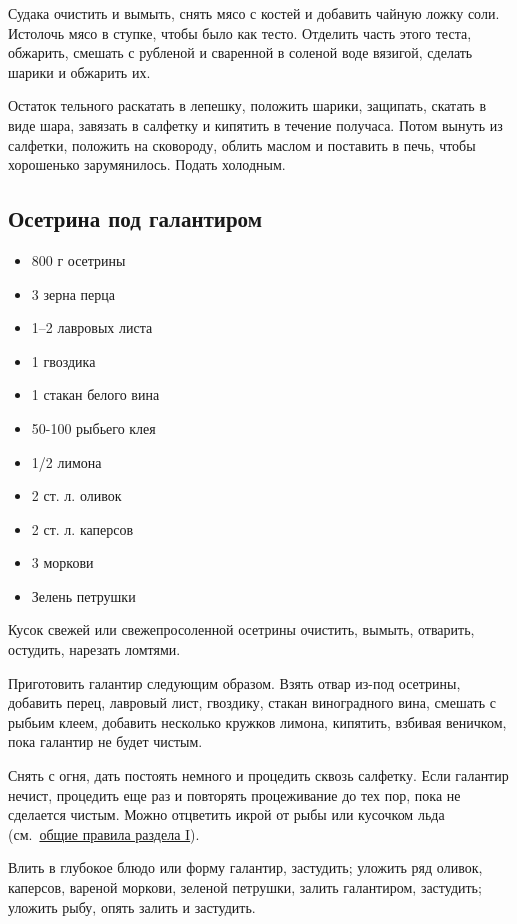 Судака очистить и вымыть, снять мясо с костей и добавить чайную ложку соли. Истолочь мясо в ступке, чтобы было как тесто. Отделить часть этого теста, обжарить, смешать с рубленой и сваренной в соленой воде вязигой, сделать шарики и обжарить их.

Остаток тельного раскатать в лепешку, положить шарики, защипать, скатать в виде шара, завязать в салфетку и кипятить в течение получаса. Потом вынуть из салфетки, положить на сковороду, облить маслом и поставить в печь, чтобы хорошенько зарумянилось. Подать холодным.

\subsection{Осетрина под галантиром}\label{7osetr-galantir}

\begin{itemize}
	\item 800 г осетрины 
    \item 3 зерна перца 
    \item 1–2 лавровых листа
    \item 1 гвоздика 
    \item 1 стакан белого вина
    \item 50-100 рыбьего клея
    \item 1/2 лимона 
    \item 2 ст. л. оливок
    \item 2 ст. л. каперсов
    \item 3 моркови 
    \item Зелень петрушки
\end{itemize}

Кусок свежей или свежепросоленной осетрины очистить, вымыть, отварить, остудить, нарезать ломтями.

Приготовить галантир следующим образом. Взять отвар из-под осетрины, добавить перец, лавровый лист, гвоздику, стакан виноградного вина, смешать с рыбьим клеем, добавить несколько кружков лимона, кипятить, взбивая веничком, пока галантир не будет чистым.

Снять с огня, дать постоять немного и процедить сквозь салфетку. Если галантир нечист, процедить еще раз и повторять процеживание до тех пор, пока не сделается чистым. Можно отцветить икрой от рыбы или кусочком льда (см.~\hyperref[0sec:obsch-nast]{общие правила раздела I}).

Влить в глубокое блюдо или форму галантир, застудить; уложить ряд оливок, каперсов, вареной моркови, зеленой петрушки, залить галантиром, застудить; уложить рыбу, опять залить и застудить.

